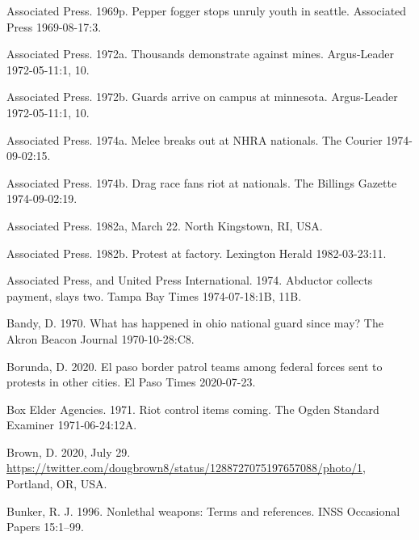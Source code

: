 \documentclass[
  11pt,
]{krantz}
\newlength{\cslhangindent}
\newenvironment{CSLReferences}[2] %
 {%
  \setlength{\parindent}{0pt}
  \ifodd #1 \everypar{\setlength{\hangindent}{\cslhangindent}}\ignorespaces\fi
  \ifnum #2 > 0
  \setlength{\parskip}{#2\baselineskip}
  \fi
 }%
 {}
\begin{document}
\begin{CSLReferences}{1}{0}
\leavevmode{}%
Associated Press. 1969p. Pepper fogger stops unruly youth in seattle. Associated Press 1969-08-17:3.

\leavevmode{}%
Associated Press. 1972a. Thousands demonstrate against mines. Argus-Leader 1972-05-11:1, 10.

\leavevmode{}%
Associated Press. 1972b. Guards arrive on campus at minnesota. Argus-Leader 1972-05-11:1, 10.

\leavevmode{}%
Associated Press. 1974a. Melee breaks out at NHRA nationals. The Courier 1974-09-02:15.

\leavevmode{}%
Associated Press. 1974b. Drag race fans riot at nationals. The Billings Gazette 1974-09-02:19.

\leavevmode{}%
Associated Press. 1982a, March 22. North Kingstown, RI, USA.

\leavevmode{}%
Associated Press. 1982b. Protest at factory. Lexington Herald 1982-03-23:11.

\leavevmode{}%
Associated Press, and United Press International. 1974. Abductor collects payment, slays two. Tampa Bay Times 1974-07-18:1B, 11B.

\leavevmode{}%
Bandy, D. 1970. What has happened in ohio national guard since may? The Akron Beacon Journal 1970-10-28:C8.

\leavevmode{}%
Borunda, D. 2020. El paso border patrol teams among federal forces sent to protests in other cities. El Paso Times 2020-07-23.

\leavevmode{}%
Box Elder Agencies. 1971. Riot control items coming. The Ogden Standard Examiner 1971-06-24:12A.

\leavevmode{}%
Brown, D. 2020, July 29. \url{https://twitter.com/dougbrown8/status/1288727075197657088/photo/1}, Portland, OR, USA.

\leavevmode{}%
Bunker, R. J. 1996. Nonlethal weapons: Terms and references. INSS Occasional Papers 15:1--99.


\end{CSLReferences}
\end{document}
